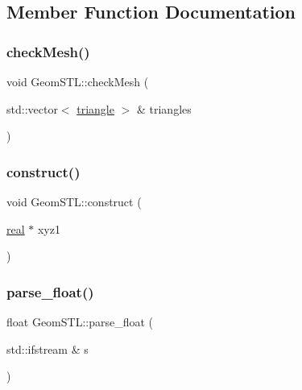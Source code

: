 \subsection{Member Function Documentation}
\mbox{\label{classGeomSTL_a55768801abe34a2326c1a5013924faac}} 
\subsubsection{\texorpdfstring{check\+Mesh()}{checkMesh()}}
{\footnotesize\ttfamily void Geom\+S\+T\+L\+::check\+Mesh (\begin{DoxyParamCaption}\item[{std\+::vector$<$ \mbox{\hyperlink{structtriangle}{triangle}} $>$ \&}]{triangles }\end{DoxyParamCaption})}

\mbox{\label{classGeomSTL_abda226b5dab2871a7b61bfaf2203234d}} 
\subsubsection{\texorpdfstring{construct()}{construct()}}
{\footnotesize\ttfamily void Geom\+S\+T\+L\+::construct (\begin{DoxyParamCaption}\item[{\mbox{\hyperlink{definitions_8h_aedc0ad84d1e764530814f57ad931d02a}{real}} $\ast$}]{xyz1 }\end{DoxyParamCaption})}

\mbox{\label{classGeomSTL_a4da4da9fdbd99722ca7e2005420a8e68}} 
\subsubsection{\texorpdfstring{parse\+\_\+float()}{parse\_float()}}
{\footnotesize\ttfamily float Geom\+S\+T\+L\+::parse\+\_\+float (\begin{DoxyParamCaption}\item[{std\+::ifstream \&}]{s }\end{DoxyParamCaption})}

